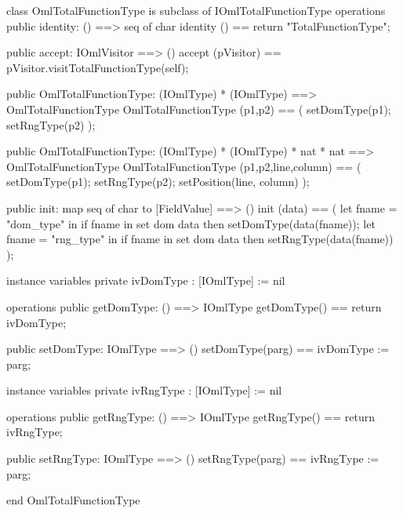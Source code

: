 \begin{vdm_al}
class OmlTotalFunctionType is subclass of IOmlTotalFunctionType
operations
  public identity: () ==> seq of char
  identity () == return "TotalFunctionType";

  public accept: IOmlVisitor ==> ()
  accept (pVisitor) == pVisitor.visitTotalFunctionType(self);

  public OmlTotalFunctionType:
    (IOmlType) *
    (IOmlType) ==> OmlTotalFunctionType
  OmlTotalFunctionType (p1,p2) == 
    ( setDomType(p1);
      setRngType(p2) );

  public OmlTotalFunctionType:
    (IOmlType) *
    (IOmlType) *
    nat *
    nat ==> OmlTotalFunctionType
  OmlTotalFunctionType (p1,p2,line,column) == 
    ( setDomType(p1);
      setRngType(p2);
      setPosition(line, column) );

  public init: map seq of char to [FieldValue] ==> ()
  init (data) ==
    ( let fname = "dom_type" in
        if fname in set dom data
        then setDomType(data(fname));
      let fname = "rng_type" in
        if fname in set dom data
        then setRngType(data(fname)) );

instance variables
  private ivDomType : [IOmlType] := nil

operations
  public getDomType: () ==> IOmlType
  getDomType() == return ivDomType;

  public setDomType: IOmlType ==> ()
  setDomType(parg) == ivDomType := parg;

instance variables
  private ivRngType : [IOmlType] := nil

operations
  public getRngType: () ==> IOmlType
  getRngType() == return ivRngType;

  public setRngType: IOmlType ==> ()
  setRngType(parg) == ivRngType := parg;

end OmlTotalFunctionType
\end{vdm_al}

